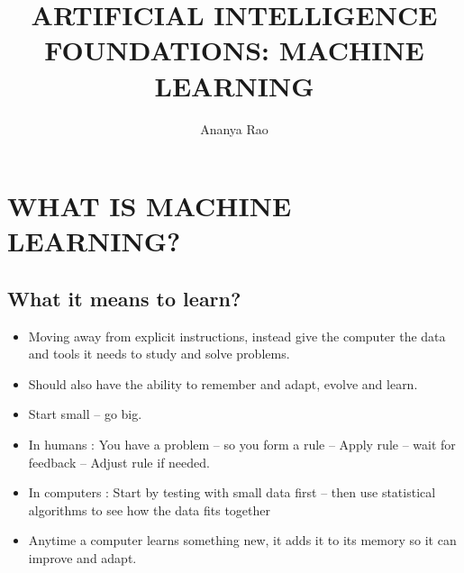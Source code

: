 \documentclass[11pt, oneside]{article}   	%
\title{ARTIFICIAL INTELLIGENCE FOUNDATIONS: MACHINE LEARNING}
\author{Ananya Rao}
\begin{document}
\maketitle
\pagebreak
\tableofcontents
\pagebreak
\section{WHAT IS MACHINE LEARNING?}
\subsection{What it means to learn?}
\begin{itemize}
\item Moving away from explicit instructions, instead give the computer the data and tools it needs to study and solve problems.
\item Should also have the ability to remember and adapt, evolve and learn.
\item Start small -- go big.
\item In humans : You have a problem -- so you form a rule -- Apply rule -- wait for feedback -- Adjust rule if needed.
\item In computers : Start by testing with small data first -- then use statistical algorithms to see how the data fits together 
\item Anytime a computer learns something new, it adds it to its memory so it can improve and adapt.
\end{itemize}
\end{document}
